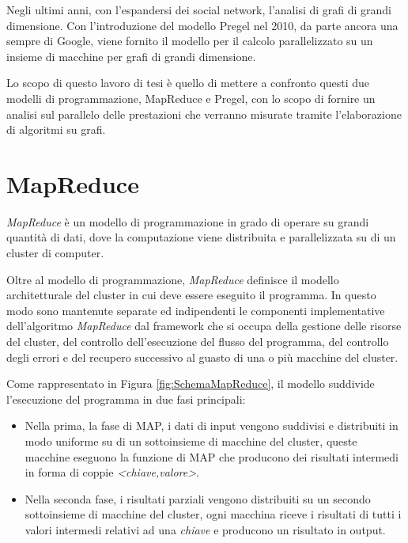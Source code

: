 \documentclass[LaM,binding=0.6cm]{sapthesis}
\begin{document}
Negli ultimi anni, con l'espandersi dei social network, l'analisi di grafi di grandi dimensione. Con l'introduzione del modello Pregel \cite{Malewicz:2010:PSL:1807167.1807184} nel 2010, da parte ancora una sempre di Google, viene fornito il modello per il calcolo parallelizzato su un insieme di macchine per grafi di grandi dimensione.

Lo scopo di questo lavoro di tesi è quello di mettere a confronto questi due modelli di programmazione, MapReduce e Pregel, con lo scopo di fornire un analisi sul parallelo delle prestazioni che verranno misurate tramite l'elaborazione di algoritmi su grafi.







\chapter{MapReduce}

\textit{MapReduce} \cite{Dean:2008:MSD:1327452.1327492} è un modello di  programmazione in grado di operare su grandi quantità di dati, dove la computazione viene distribuita e parallelizzata su di un cluster di computer.

Oltre al modello di programmazione, \textit{MapReduce} definisce il modello architetturale del cluster in cui deve essere eseguito il programma. In questo modo sono mantenute separate ed indipendenti le componenti implementative dell'algoritmo \textit{MapReduce} dal framework che si occupa della gestione delle risorse del cluster, del controllo dell'esecuzione del flusso del programma, del controllo degli errori e del recupero successivo al guasto di una o più macchine del cluster.


Come rappresentato in Figura \ref{fig:SchemaMapReduce}, il modello suddivide l'esecuzione del programma in due fasi principali: 
	\begin{itemize}
	\item Nella prima, la fase di MAP, i dati di input vengono suddivisi e distribuiti in modo uniforme su di un sottoinsieme di  macchine del cluster, queste macchine eseguono la funzione di MAP che producono dei risultati intermedi in forma di coppie \textit{<chiave,valore>}.
	\item Nella seconda fase, i risultati parziali vengono distribuiti su un secondo sottoinsieme di macchine del cluster, ogni macchina riceve i risultati di tutti i valori intermedi relativi ad una \textit{chiave} e producono un risultato in output.
	\end{itemize}
	
\end{document}
